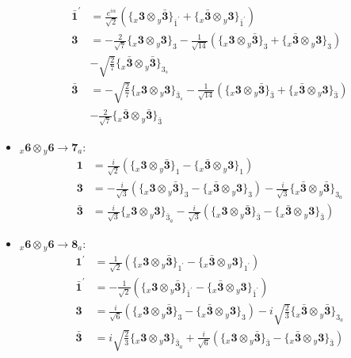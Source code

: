 \documentclass[english]{article}
\newcommand{\rep}[1]{\mathbf{#1}}
\newcommand{\repx}[2]{{}_{#2}\mathbf{#1}}
\newcommand{\tsprodx}[2]{\repx{#1}{x}\otimes\repx{#2}{y}}
\newcommand{\subcgt}[3]{\big\{ \tsprodx{#1}{#2}\big\}^{}_{#3}}
\begin{document}
\begin{itemize}
\begin{align*}
\\
\rep{\bar{1}^{\prime}} & = \frac{e^{i \alpha }}{\sqrt{2}}\left(\subcgt{3}{\bar{3}}{\bar{1}^{\prime}}+\subcgt{\bar{3}}{3}{\bar{1}^{\prime}}\right)
\\
\rep{3} & = -\frac{2}{\sqrt{7}}\subcgt{3}{3}{3}-\frac{1}{\sqrt{14}}\left(\subcgt{3}{\bar{3}}{3}+\subcgt{\bar{3}}{3}{3}\right) \\ 
 & -\sqrt{\frac{2}{7}}\subcgt{\bar{3}}{\bar{3}}{3_{s}}
\\
\rep{\bar{3}} & = -\sqrt{\frac{2}{7}}\subcgt{3}{3}{\bar{3}_{s}}-\frac{1}{\sqrt{14}}\left(\subcgt{3}{\bar{3}}{\bar{3}}+\subcgt{\bar{3}}{3}{\bar{3}}\right) \\ 
 & -\frac{2}{\sqrt{7}}\subcgt{\bar{3}}{\bar{3}}{\bar{3}}
\end{align*}
\item $\tsprodx{6}{6}\to\rep{7}_{a}$:
\begin{align*}
\rep{1} & = \frac{i}{\sqrt{2}}\left(\subcgt{3}{\bar{3}}{1}-\subcgt{\bar{3}}{3}{1}\right)
\\
\rep{3} & = -\frac{i}{\sqrt{3}}\left(\subcgt{3}{\bar{3}}{3}-\subcgt{\bar{3}}{3}{3}\right)-\frac{i}{\sqrt{3}}\subcgt{\bar{3}}{\bar{3}}{3_{a}}
\\
\rep{\bar{3}} & = \frac{i}{\sqrt{3}}\subcgt{3}{3}{\bar{3}_{a}}-\frac{i}{\sqrt{3}}\left(\subcgt{3}{\bar{3}}{\bar{3}}-\subcgt{\bar{3}}{3}{\bar{3}}\right)
\end{align*}
\item $\tsprodx{6}{6}\to\rep{8}_{a}$:
\begin{align*}
\rep{1^{\prime}} & = \frac{1}{\sqrt{2}}\left(\subcgt{3}{\bar{3}}{1^{\prime}}-\subcgt{\bar{3}}{3}{1^{\prime}}\right)
\\
\rep{\bar{1}^{\prime}} & = -\frac{1}{\sqrt{2}}\left(\subcgt{3}{\bar{3}}{\bar{1}^{\prime}}-\subcgt{\bar{3}}{3}{\bar{1}^{\prime}}\right)
\\
\rep{3} & = \frac{i}{\sqrt{6}}\left(\subcgt{3}{\bar{3}}{3}-\subcgt{\bar{3}}{3}{3}\right)-i \sqrt{\frac{2}{3}}\subcgt{\bar{3}}{\bar{3}}{3_{a}}
\\
\rep{\bar{3}} & = i \sqrt{\frac{2}{3}}\subcgt{3}{3}{\bar{3}_{a}}+\frac{i}{\sqrt{6}}\left(\subcgt{3}{\bar{3}}{\bar{3}}-\subcgt{\bar{3}}{3}{\bar{3}}\right)
\end{align*}
\end{itemize}
\end{document}
